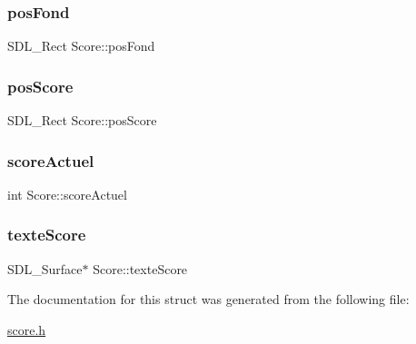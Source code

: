 \mbox{\label{structScore_a578e743bcee6d68e53de231fd0f0dbbf}} 
\subsubsection{\texorpdfstring{pos\+Fond}{posFond}}
{\footnotesize\ttfamily S\+D\+L\+\_\+\+Rect Score\+::pos\+Fond}

\mbox{\label{structScore_a163319fdcee50a9d6ff99dad49809ae9}} 
\subsubsection{\texorpdfstring{pos\+Score}{posScore}}
{\footnotesize\ttfamily S\+D\+L\+\_\+\+Rect Score\+::pos\+Score}

\mbox{\label{structScore_a1dc9e9448e13b692f49293078e2db059}} 
\subsubsection{\texorpdfstring{score\+Actuel}{scoreActuel}}
{\footnotesize\ttfamily int Score\+::score\+Actuel}

\mbox{\label{structScore_ae9a968b720621f536298fd15749463e2}} 
\subsubsection{\texorpdfstring{texte\+Score}{texteScore}}
{\footnotesize\ttfamily S\+D\+L\+\_\+\+Surface$\ast$ Score\+::texte\+Score}



The documentation for this struct was generated from the following file\+:\begin{DoxyCompactItemize}
\item 
\hyperlink{score_8h}{score.\+h}\end{DoxyCompactItemize}
